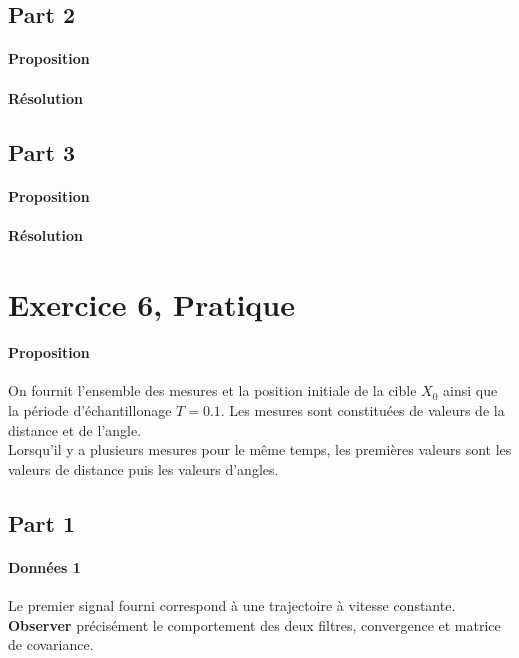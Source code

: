 \documentclass{article}
\begin{document}
\subsection{Part 2}
\paragraph{Proposition}

\paragraph{Résolution}


\subsection{Part 3}
\paragraph{Proposition}

\paragraph{Résolution}



\section{Exercice 6, Pratique}
\paragraph{Proposition}On fournit l'ensemble des mesures et la position initiale de la cible $X_0$ ainsi que la période d'échantillonage $T=0.1$. Les mesures sont constituées de valeurs de la distance et de l'angle.\\

\noindent Lorsqu'il y a plusieurs mesures pour le même temps, les premières valeurs sont les valeurs de distance puis les valeurs d'angles.

\subsection{Part 1}
\paragraph{Données 1}Le premier signal fourni correspond à une trajectoire à vitesse constante. \textbf{Observer} précisément le comportement des deux filtres, convergence et matrice de covariance.
\end{document}
